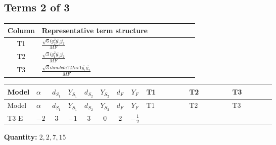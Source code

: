 \documentclass[8pt]{article}
\begin{document}
\begin{landscape}
\subsection*{Terms 2 of 3}
\begin{center}
\begin{tabular}{@{}c >{\raggedright\arraybackslash}p{0.82\linewidth}@{}}
\toprule
Column & Representative term structure \\
\midrule
T1 & \(\displaystyle \frac{\sqrt{6} i g_{2}^{2} \overline{y_{1}} \overline{y_{2}}}{MF}\) \\
\midrule
T2 & \(\displaystyle \frac{\sqrt{3} i g_{1}^{2} \overline{y_{1}} \overline{y_{2}}}{MF}\) \\
\midrule
T3 & \(\displaystyle \frac{\sqrt{3} i lambda12Inv1 \overline{y_{1}} \overline{y_{2}}}{MF}\) \\
\midrule
\bottomrule
\end{tabular}
\end{center}
\smallskip
\tiny
\begin{longtable}{@{}llcccccc >{\raggedright\arraybackslash}p{0.21\linewidth} >{\raggedright\arraybackslash}p{0.21\linewidth} >{\raggedright\arraybackslash}p{0.21\linewidth}@{}}
\toprule
Model & $\alpha$ & $d_{S_1}$ & $Y_{S_1}$ & $d_{S_2}$ & $Y_{S_2}$ & $d_F$ & $Y_F$ & T1 & T2 & T3 \\
\midrule
\endfirsthead
\toprule
Model & $\alpha$ & $d_{S_1}$ & $Y_{S_1}$ & $d_{S_2}$ & $Y_{S_2}$ & $d_F$ & $Y_F$ & T1 & T2 & T3 \\
\midrule
\endhead
T3-E & $-2$ & $3$ & $-1$ & $3$ & $0$ & $2$ & $-\frac{1}{2}$ & \scriptsize\adjustbox{max width=\linewidth}{$\begin{gathered} - \frac{\sqrt{6} i g_{2}^{2} \overline{y_{1}} \overline{y_{2}}}{3 MF}\end{gathered}$} & \scriptsize\adjustbox{max width=\linewidth}{$\begin{gathered} - \frac{\sqrt{3} i g_{1}^{2} \overline{y_{1}} \overline{y_{2}}}{8 MF}\end{gathered}$} & \scriptsize\adjustbox{max width=\linewidth}{$\begin{gathered} \frac{\sqrt{3} i lambda12Inv1 \overline{y_{1}} \overline{y_{2}}}{6 MF}\end{gathered}$} \\
\midrule
\bottomrule
\end{longtable}
\clearpage
\noindent\textbf{Quantity: }$\mathrm{2,2,7,15}$\par\smallskip

\end{landscape}
\end{document}
